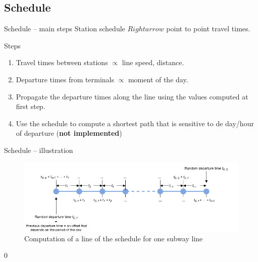 \subsection{Schedule}
\begin{frame}{Schedule -- main steps}
	Station schedule $Rightarrow$ point to point travel times.
	\begin{block}{Steps}
		\begin{enumerate}
		\item Travel times between stations $\propto$ line speed, distance.
		\item Departure times from terminals $\propto$ moment of the day.
		\item Propagate the departure times along the line using the values computed at first step.
		\item Use the schedule to compute a shortest path that is sensitive to de day/hour of departure (\textbf{not implemented})
		\end{enumerate}
	\end{block} 
\end{frame}
\begin{frame}{Schedule --  illustration}
	\begin{figure}
		\centering
		\includegraphics[width=\linewidth]{images/schedule.png}
		\caption{Computation of a line of the schedule for one subway line}
	\end{figure}
\end{frame}0